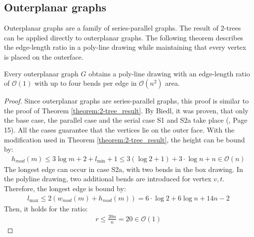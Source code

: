 \subsection{Outerplanar graphs}
Outerplanar graphs are a family of series-parallel graphs. The result of 2-trees can be applied directly to outerplanar graphs. The following theorem describes the edge-length ratio in a poly-line drawing while maintaining that every vertex is placed on the outerface.
\begin{theorem}
	Every outerplanar graph $G$ obtains a poly-line drawing with an edge-length ratio of $\mathcal{O}(1)$ with up to four bends per edge in $\mathcal{O}(n^2)$ area.
\end{theorem}
\begin{proof}
	Since outerplanar graphs are series-parallel graphs, this proof is similar to the proof of Theorem \ref{theorem:2-tree_result}. By Biedl, it was proven, that only the base case, the parallel case and the serial case S1 and S2a take place (\cite{DBLP:journals/dcg/Biedl11}, Page 15). All the cases guarantee that the vertices lie on the outer face.
	With the modification used in Theorem \ref{theorem:2-tree_result}, the height can be bound by:
	\begin{align}
		h_{mod}(m)\leq 3\log m + 2 + l_{\min} + 1\leq 3(\log 2 +1)+3\cdot \log n + n \in \mathcal{O}(n)
	\end{align}
	The longest edge can occur in case S2a, with two bends in the box drawing. In the polyline drawing, two additional bends are introduced for vertex $v,t$. Therefore, the longest edge is bound by:
	\begin{align}
		l_{\max}\leq 2(w_{mod}(m)+h_{mod}(m))= 6\cdot \log 2 +6\log n + 14n - 2
	\end{align}
	Then, it holds for the ratio:
	\begin{align}r \leq \frac{20n}{n} = 20 \in \mathcal{O}(1)
	\end{align}
\end{proof}